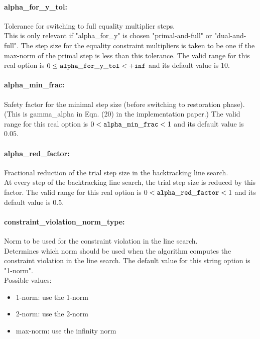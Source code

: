 \paragraph{alpha\_for\_y\_tol:}\label{opt:alpha_for_y_tol} Tolerance for switching to full equality multiplier steps. \\
 This is only relevant if "alpha\_for\_y" is chosen "primal-and-full" or "dual-and-full".  The step size for the equality constraint multipliers is taken to be one if the max-norm of the primal step is less than this tolerance. The valid range for this real option is 
$0 \le {\tt alpha\_for\_y\_tol } <  {\tt +inf}$
and its default value is $10$.


\paragraph{alpha\_min\_frac:}\label{opt:alpha_min_frac} Safety factor for the minimal step size (before switching to restoration phase). \\
 (This is gamma\_alpha in Eqn. (20) in the implementation paper.) The valid range for this real option is 
$0 <  {\tt alpha\_min\_frac } <  1$
and its default value is $0.05$.


\paragraph{alpha\_red\_factor:}\label{opt:alpha_red_factor} Fractional reduction of the trial step size in the backtracking line search. \\
 At every step of the backtracking line search, the trial step size is reduced by this factor. The valid range for this real option is 
$0 <  {\tt alpha\_red\_factor } <  1$
and its default value is $0.5$.


\paragraph{constraint\_violation\_norm\_type:}\label{opt:constraint_violation_norm_type} Norm to be used for the constraint violation in the line search. \\
 Determines which norm should be used when the algorithm computes the constraint violation in the line search. The default value for this string option is "1-norm".
\\ 
Possible values:
\begin{itemize}
   \item 1-norm: use the 1-norm
   \item 2-norm: use the 2-norm
   \item max-norm: use the infinity norm
\end{itemize}

